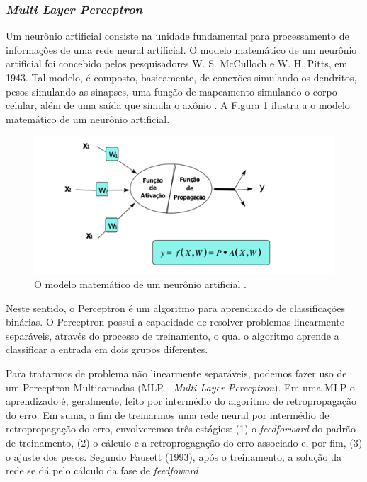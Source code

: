 \documentclass[12pt]{article}
\begin{document}
\subsubsection{\textit{Multi Layer Perceptron}}

Um neurônio artificial consiste na unidade fundamental para processamento de informações de uma rede neural artificial. O modelo matemático de um neurônio artificial foi concebido pelos pesquisadores W. S. McCulloch e W. H. Pitts, em 1943. Tal modelo, é composto, basicamente, de conexões simulando os dendritos, pesos simulando as sinapses, uma função de mapeamento simulando o corpo celular, além de uma saída que simula o axônio \cite{fausett2006fundamentals}. A Figura \ref{fig:neuronio} ilustra a o modelo matemático de um neurônio artificial.

\begin{figure}[!ht]
    \centering
    \includegraphics[width = 0.65\textheight]{figures/neuronio.png}
    \caption{O modelo matemático de um neurônio artificial \cite{thome2002redes}.}
    \label{fig:neuronio}
\end{figure}

Neste sentido, o Perceptron é um algoritmo para aprendizado de classificações binárias. O Perceptron possui a capacidade de resolver problemas linearmente separáveis, através do processo de treinamento, o qual o algoritmo aprende a classificar a entrada em dois grupos diferentes.

Para tratarmos de problema não linearmente separáveis, podemos fazer uso de um Perceptron Multicamadas (MLP - \textit{Multi Layer Perceptron}). Em uma MLP o aprendizado é, geralmente, feito por intermédio do algoritmo de retropropagação do erro. Em suma, a fim de treinarmos uma rede neural por intermédio de retropropagação do erro, envolveremos três estágios: (1) o \textit{feedforward} do padrão de treinamento, (2) o cálculo e a retroprogagação do erro associado e, por fim, (3) o ajuste dos pesos. Segundo Fausett (1993), após o treinamento, a solução da rede se dá pelo cálculo da fase de \textit{feedfoward} \cite{fausett2006fundamentals}.
\end{document}
